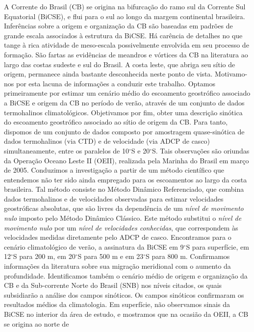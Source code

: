 
\hspace{6mm} A Corrente do Brasil (CB) se origina na bifurcação do ramo sul da  
Corrente Sul Equatorial (BiCSE), e flui para o sul ao longo da margem
continental brasileira. Inferências sobre a origem e organização da CB
são baseadas em padrões de grande escala associados à estrutura da
BiCSE. Há carência de detalhes no que tange à rica atividade de
meso-escala possivelmente envolvida em seu processo de formação.
São fartas as evidências de meandros e vórtices da CB na literatura ao
largo das costas sudeste e sul do Brasil.  A costa leste, que abriga
seu sítio de origem, permanece ainda bastante desconhecida neste ponto
de vista.  Motivamo-nos por esta lacuna de informações a conduzir este
trabalho. Optamos primeiramente por estimar um cenário médio do
escoamento geostrófico associado a BiCSE e origem da CB no período de
verão, através de um conjunto de dados termohalinos
climatológicos. Objetivamos por fim, obter uma descrição sinótica do
escoamento geostrófico associado ao sítio de origem da CB. Para tanto,
dispomos de um conjunto de dados composto por amostragem
quase-sinótica de dados termohalinos (via CTD) e de velocidade (via
ADCP de casco) simultaneamente, entre os paralelos de 10$^\circ$S e
20$^\circ$S.  Tais observações são oriundas da Operação Oceano Leste
II (OEII), realizada pela Marinha do Brasil em março de 2005.
Conduzimos a investigação a partir de um método científico que
entendemos não ter sido ainda empregado para os escoamentos ao largo
da costa brasileira. Tal método consiste no Método Dinâmico
Referenciado, que combina dados termohalinos e de velocidades
observadas para estimar velocidades geostróficas absolutas, que são
livres da dependência de um {\it nível de movimento nulo} imposto pelo
Método Dinâmico Clássico.  Este método substitui o {\it nível de
movimento nulo} por um {\it nível de velocidades conhecidas}, que
correspondem às velocidades medidas diretamente pelo ADCP de casco.
Encontramos para o cenário climatológico de verão, a assinatura da
BiCSE em 9$^\circ$S para superfície, em 12$^\circ$S para 200 m, em
20$^\circ$S para 500 m e em 23$^\circ$S para 800 m. Confirmamos
informações da literatura sobre sua migração meridional com o aumento
da profundidade. Identificamos também o cenário médio de origem e
organização da CB e da Sub-corrente Norte do Brasil (SNB) nos níveis
citados, os quais subsidiarão a análise dos campos sinóticos.  Os
campos sinóticos confirmaram os resultados médios da climatologia. Em
superfície, não observamos sinais da BiCSE no interior da área de estudo, e
mostramos que na ocasião da OEII, a CB se origina ao norte de
